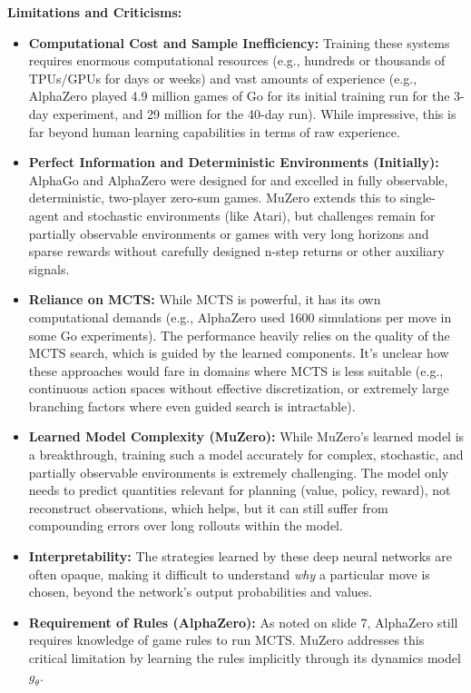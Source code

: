 \documentclass[11pt,a4paper]{article}
\begin{document}
\textbf{Limitations and Criticisms:}
\begin{itemize}
    \item \textbf{Computational Cost and Sample Inefficiency:} Training these systems requires enormous computational resources (e.g., hundreds or thousands of TPUs/GPUs for days or weeks) and vast amounts of experience (e.g., AlphaZero played 4.9 million games of Go for its initial training run for the 3-day experiment, and 29 million for the 40-day run). While impressive, this is far beyond human learning capabilities in terms of raw experience.
    \item \textbf{Perfect Information and Deterministic Environments (Initially):} AlphaGo and AlphaZero were designed for and excelled in fully observable, deterministic, two-player zero-sum games. MuZero extends this to single-agent and stochastic environments (like Atari), but challenges remain for partially observable environments or games with very long horizons and sparse rewards without carefully designed n-step returns or other auxiliary signals.
    \item \textbf{Reliance on MCTS:} While MCTS is powerful, it has its own computational demands (e.g., AlphaZero used 1600 simulations per move in some Go experiments). The performance heavily relies on the quality of the MCTS search, which is guided by the learned components. It's unclear how these approaches would fare in domains where MCTS is less suitable (e.g., continuous action spaces without effective discretization, or extremely large branching factors where even guided search is intractable).
    \item \textbf{Learned Model Complexity (MuZero):} While MuZero's learned model is a breakthrough, training such a model accurately for complex, stochastic, and partially observable environments is extremely challenging. The model only needs to predict quantities relevant for planning (value, policy, reward), not reconstruct observations, which helps, but it can still suffer from compounding errors over long rollouts within the model.
    \item \textbf{Interpretability:} The strategies learned by these deep neural networks are often opaque, making it difficult to understand \textit{why} a particular move is chosen, beyond the network's output probabilities and values.
    \item \textbf{Requirement of Rules (AlphaZero):} As noted on slide 7, AlphaZero still requires knowledge of game rules to run MCTS. MuZero addresses this critical limitation by learning the rules implicitly through its dynamics model $g_{\theta}$.

\end{itemize}
\end{document}
